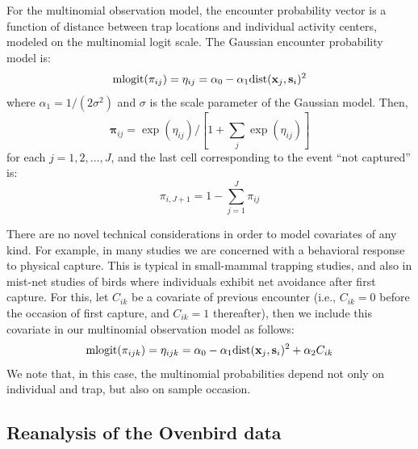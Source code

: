 For the multinomial observation model, the encounter probability
vector is a function of distance between trap locations and individual
activity centers, modeled on the multinomial logit scale. The
Gaussian encounter probability model is:
\begin{equation}
\mbox{mlogit}(\pi_{ij}) = \eta_{ij}  =  \alpha_0 - \alpha_{1} \mbox{dist}({\bf x}_{j},{\bf s}_{i})^2
\label{hscr.eq.mlogit}
\end{equation}
where $\alpha_{1} = 1/(2\sigma^2)$ and $\sigma$ is the scale
parameter of the Gaussian model. Then,
\[
{\bm \pi}_{ij} = \exp(\eta_{ij})/[ 1 + \sum_{j} \exp(\eta_{ij}) ]
\]
for each $j=1,2,\ldots,J$, and the last cell corresponding to the
event ``not captured'' is:
\[
\pi_{i,J+1} = 1- \sum_{j=1}^{J} \pi_{ij}
\]

There are no novel technical considerations in order to model
covariates of any kind.  For example, in many studies we are concerned
with a behavioral response to physical capture. This is typical in
small-mammal trapping studies, and also in mist-net studies of birds
where individuals exhibit net avoidance after first capture. For this,
let $C_{ik}$ be a covariate of previous encounter (i.e., $C_{ik} = 0$
before the occasion of first capture, and $C_{ik} = 1$ thereafter),
then we include this covariate in our multinomial observation model as
follows:
\[
\mbox{mlogit}(\pi_{ijk}) = \eta_{ijk} = \alpha_{0}  - \alpha_{1}
\mbox{dist}({\bf  x}_{j},{\bf s}_{i})^2 +  \alpha_{2} C_{ik}
\]
We note that, in this case, the multinomial probabilities depend not only
on individual and trap, but also on sample occasion.

\subsection{Reanalysis of the Ovenbird data}

